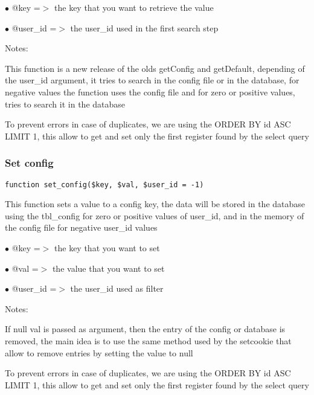 \documentclass[a4paper]{article}
\begin{document}
\begin{compactitem}
\item[\color{myblue}$\bullet$] @key     =$>$ the key that you want to retrieve the value
\item[\color{myblue}$\bullet$] @user\_id =$>$ the user\_id used in the first search step
\end{compactitem}

Notes:

This function is a new release of the olds getConfig and getDefault,
depending of the user\_id argument, it tries to search in the config file or
in the database, for negative values the function uses the config file and
for zero or positive values, tries to search it in the database

To prevent errors in case of duplicates, we are using the ORDER BY id ASC
LIMIT 1, this allow to get and set only the first register found by the
select query

\hypertarget{toc80}{}
\subsubsection{Set config}

\begin{lstlisting}
function set_config($key, $val, $user_id = -1)
\end{lstlisting}

This function sets a value to a config key, the data will be stored in the
database using the tbl\_config for zero or positive values of user\_id, and
in the memory of the config file for negative user\_id values

\begin{compactitem}
\item[\color{myblue}$\bullet$] @key     =$>$ the key that you want to set
\item[\color{myblue}$\bullet$] @val     =$>$ the value that you want to set
\item[\color{myblue}$\bullet$] @user\_id =$>$ the user\_id used as filter
\end{compactitem}

Notes:

If null val is passed as argument, then the entry of the config or database
is removed, the main idea is to use the same method used by the setcookie
that allow to remove entries by setting the value to null

To prevent errors in case of duplicates, we are using the ORDER BY id ASC
LIMIT 1, this allow to get and set only the first register found by the
select query
\end{document}
